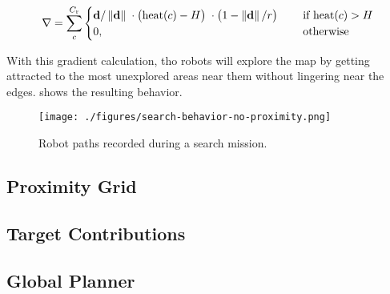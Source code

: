 \begin{equation}
\label{eq:robot-gradient}
    \nabla = \sum_c^{C_\mathrm{r}}
    \begin{cases}
        \mathbf{d}/\left\lVert\mathbf{d}\right\rVert      \; \cdot
        \big(\mathrm{heat}(c) - H\big)    \; \cdot
        \big(1 - \left\lVert\mathbf{d}\right\rVert/r\big) \; \quad &\text{if } \mathrm{heat}(c) > H
        \\
        0, \quad &\text{otherwise}
    \end{cases}
\end{equation}

With this gradient calculation, tho robots will explore the map by getting attracted to the most unexplored areas near them without lingering near the edges.  shows the resulting behavior.

\begin{figure}[h]
    \begin{center}
        \texttt{[image: ./figures/search-behavior-no-proximity.png]}
    \end{center}
    \caption{Robot paths recorded during a search mission.}
    \label{fig:search-no-proximity}
\end{figure}

\subsection{Proximity Grid}

\subsection{Target Contributions}

\subsection{Global Planner}

